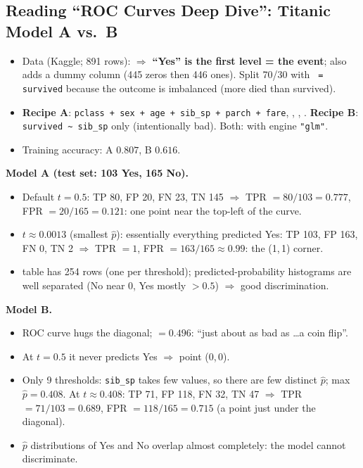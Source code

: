 \subsection{Reading ``ROC Curves Deep Dive'': Titanic Model A vs.\ B}
\begin{itemize}
\item Data  (Kaggle; 891 rows): 
  $\Rightarrow$ \textbf{``Yes'' is the first level = the event}; also adds a dummy
   column (445 zeros then 446 ones). Split 70/30 with \texttt{ = survived}
  because the outcome is imbalanced (more died than survived).
\item \textbf{Recipe A}: \texttt{pclass + sex + age + sib\_sp + parch + fare}, ,
  , . \textbf{Recipe B}: \texttt{survived \textasciitilde{} sib\_sp} only
  (intentionally bad). Both:  with engine \texttt{"glm"}.
\item Training accuracy: A $0.807$, B $0.616$.
\end{itemize}
\textbf{Model A (test set: 103 Yes, 165 No).}
\begin{itemize}
\item Default $t=0.5$: TP 80, FP 20, FN 23, TN 145 $\Rightarrow$ TPR $=80/103=0.777$, FPR $=20/165=0.121$:
  one point near the top-left of the curve.
\item $t\approx0.0013$ (smallest $\hat p$): essentially everything predicted Yes: TP 103, FP 163, FN 0, TN 2
  $\Rightarrow$ TPR $=1$, FPR $=163/165\approx0.99$: the (1,\,1) corner.
\item {} table has 254 rows (one per threshold); predicted-probability histograms are well
  separated (No near 0, Yes mostly $>0.5$) $\Rightarrow$ good discrimination.
\end{itemize}
\textbf{Model B.}
\begin{itemize}
\item ROC curve hugs the diagonal;  $=0.496$: ``just about as bad as \ldots a coin flip''.
\item At $t=0.5$ it never predicts Yes $\Rightarrow$ point (0,\,0).
\item Only 9 thresholds: \texttt{sib\_sp} takes few values, so there are few distinct $\hat p$; max $\hat p=0.408$.
  At $t\approx0.408$: TP 71, FP 118, FN 32, TN 47 $\Rightarrow$ TPR $=71/103=0.689$, FPR $=118/165=0.715$
  (a point just under the diagonal).
\item $\hat p$ distributions of Yes and No overlap almost completely: the model cannot discriminate.
\end{itemize}

